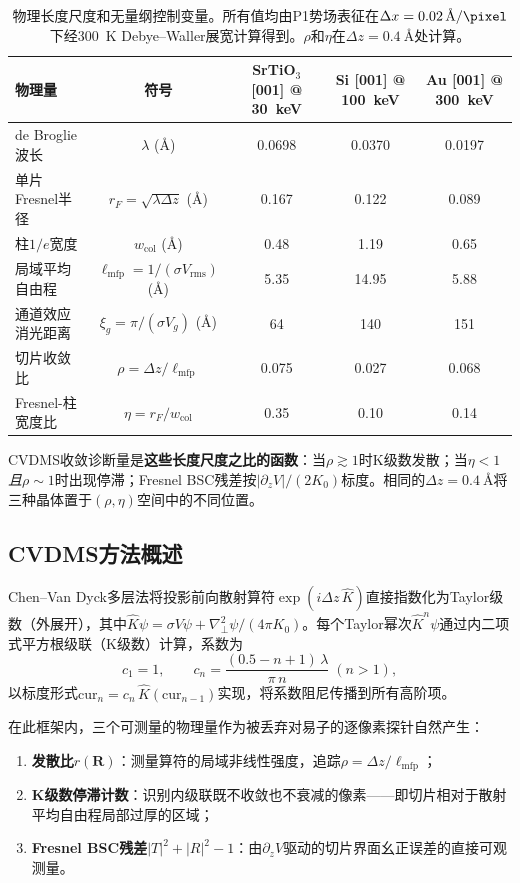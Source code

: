 \documentclass[twoside,11pt]{ctexart}
\begin{document}
\begin{table}[H]
\centering
\caption{物理长度尺度和无量纲控制变量。所有值均由P1势场表征在$\Delta x=\SI{0.02}{\angstrom\per\pixel}$下经\SI{300}{\kelvin} Debye--Waller展宽计算得到。$\rho$和$\eta$在$\Delta z=\SI{0.4}{\angstrom}$处计算。}\label{tab:length-scales}
\small
\begin{tabular}{lcccc}
\toprule
物理量 & 符号 & SrTiO$_3$ [001] @ 30~keV & Si [001] @ 100~keV & Au [001] @ 300~keV \\
\midrule
de Broglie波长 & $\lambda$ (\AA) & 0.0698 & 0.0370 & 0.0197 \\
单片Fresnel半径 & $r_F=\sqrt{\lambda\Delta z}$ (\AA) & 0.167 & 0.122 & 0.089 \\
柱$1/e$宽度 & $w_\text{col}$ (\AA) & 0.48 & 1.19 & 0.65 \\
局域平均自由程 & $\ell_\text{mfp}=1/(\sigma V_\text{rms})$ (\AA) & 5.35 & 14.95 & 5.88 \\
通道效应消光距离 & $\xi_g=\pi/(\sigma V_g)$ (\AA) & 64 & 140 & 151 \\
切片收敛比 & $\rho=\Delta z/\ell_\text{mfp}$ & 0.075 & 0.027 & 0.068 \\
Fresnel-柱宽度比 & $\eta=r_F/w_\text{col}$ & 0.35 & 0.10 & 0.14 \\
\bottomrule
\end{tabular}
\end{table}

CVDMS收敛诊断量是\textbf{这些长度尺度之比的函数}：当$\rho\gtrsim1$时K级数发散；当$\eta<1$\textit{且}$\rho\sim1$时出现停滞；Fresnel BSC残差按$|\partial_z V|/(2K_0)$标度。相同的$\Delta z=\SI{0.4}{\angstrom}$将三种晶体置于$(\rho,\eta)$空间中的不同位置。

\subsection{CVDMS方法概述}

Chen--Van Dyck多层法将投影前向散射算符$\exp(i\Delta z\,\hat{K})$直接指数化为Taylor级数（外展开），其中$\hat{K}\psi=\sigma V\psi+\nabla_\perp^2\psi/(4\pi K_0)$。每个Taylor幂次$\hat{K}^n\psi$通过内二项式平方根级联（K级数）计算，系数为
\begin{equation}\label{eq:coeffs}
c_1=1,\qquad c_n=\frac{(0.5-n+1)\,\lambda}{\pi\,n}\;(n>1),
\end{equation}
以标度形式$\text{cur}_n=c_n\,\hat{K}(\text{cur}_{n-1})$实现，将系数阻尼传播到所有高阶项。

在此框架内，三个可测量的物理量作为被丢弃对易子的逐像素探针自然产生：
\begin{enumerate}[nosep]
\item \textbf{发散比}$r(\mathbf{R})$：测量算符的局域非线性强度，追踪$\rho=\Delta z/\ell_\text{mfp}$；
\item \textbf{K级数停滞计数}：识别内级联既不收敛也不衰减的像素——即切片相对于散射平均自由程局部过厚的区域；
\item \textbf{Fresnel BSC残差}$|T|^2+|R|^2-1$：由$\partial_z V$驱动的切片界面幺正误差的直接可观测量。
\end{enumerate}
\end{document}
